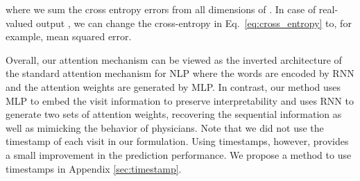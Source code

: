 where we sum the cross entropy errors from all dimensions of . In case of real-valued output , we can change the cross-entropy in Eq.~\eqref{eq:cross_entropy} to, for example, mean squared error.

Overall, our attention mechanism can be viewed as the inverted architecture of the standard attention mechanism for NLP \cite{bahdanau2014neural} where the words are encoded by RNN and the attention weights are generated by MLP. In contrast, our method uses MLP to embed the visit information to preserve interpretability and uses RNN to generate two sets of attention weights, recovering the sequential information as well as mimicking the behavior of physicians. 
Note that we did not use the timestamp of each visit in our formulation. Using timestamps, however, provides a small improvement in the prediction performance. We propose a method to use timestamps in	 Appendix \ref{sec:timestamp}.
